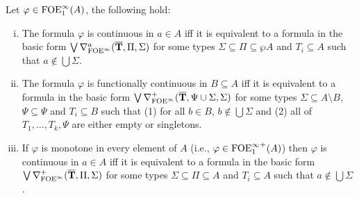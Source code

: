 \begin{corollary}\label{cor:ofoeicontinuousnf}
Let $\varphi \in \ofoei(A)$, the following hold:
	\begin{enumerate}[(i)]
		\item The formula $\varphi$ is continuous in $a \in A$ iff it is equivalent to a formula in the basic form $\bigvee \mondbnfofoei{\vlist{T}}{\Pi}{\Sigma}{a}$ for some types $\Sigma\subseteq\Pi \subseteq \wp A$ and $T_i \subseteq A$ such that $a\notin \bigcup\Sigma$. 	\label{pt:ofoeifcontinuous}	%
				\item The formula $\varphi$ is functionally continuous in $B \subseteq A$ iff it is equivalent to a formula in the basic form $\bigvee \mondbnfofoei{\vlist{T}}{\Psi \cup \Sigma}{\Sigma}{+}$ for some types $\Sigma\subseteq A \setminus B$, $\Psi \subseteq \Psi$ and $T_i \subseteq B$ such that (1) for all $b \in B$, $b\notin \bigcup\Sigma$ and (2) all of $T_1,\dots,T_k,\Psi$ are either empty or singletons. 	\label{pt:ofoeifunctionalcontinuous}	%
		\item If $\varphi$ is monotone in every element of $A$ (i.e., $\varphi\in{\ofoei}^+(A)$) then $\varphi$ is continuous in $a \in A$ iff it is equivalent to a formula in the basic form $\bigvee \posdbnfofoei{\vlist{T}}{\Pi}{\Sigma}$ for some types $\Sigma\subseteq\Pi \subseteq A$ and $T_i \subseteq A$ such that $a\notin \bigcup\Sigma$. \label{pt:ofoeimonotone}
	\end{enumerate}
\end{corollary}
